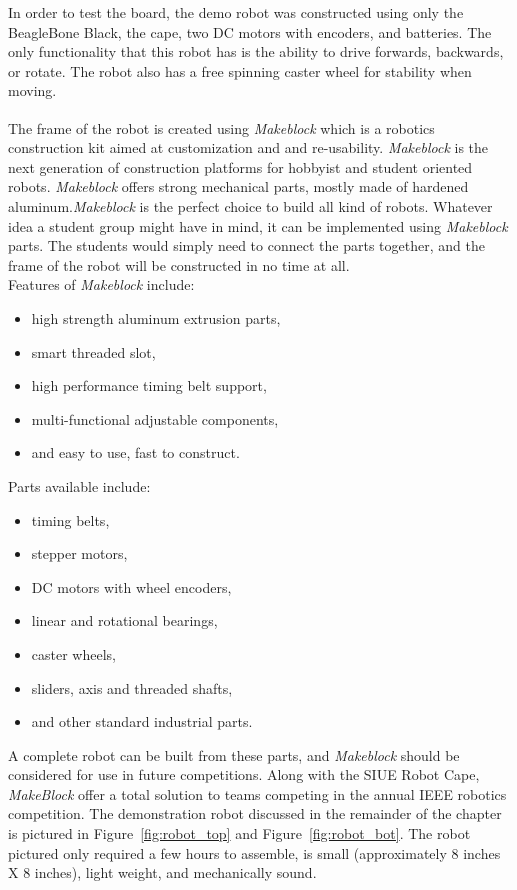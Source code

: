 \documentclass[12pt,oneside,final]{siuethesis}
\theoremstyle{definition}
\begin{document}
In order to test the board, the demo robot was constructed using only the BeagleBone Black, the cape, two DC motors with encoders, and batteries. The only functionality that this robot has is the ability to drive forwards, backwards, or rotate. The robot also has a free spinning caster wheel for stability when moving. 

The frame of the robot is created using \emph{Makeblock}\textsuperscript{\textregistered} which is a robotics construction kit aimed at customization and and re-usability. \emph{Makeblock} is the next generation of construction platforms for hobbyist and student oriented robots. \emph{Makeblock} offers strong mechanical parts, mostly made of hardened aluminum.\emph{Makeblock} is the perfect choice to build all kind of robots. Whatever idea a student group might have in mind, it can be implemented using \emph{Makeblock} parts.  The students would simply need to connect the parts together, and the frame of the robot will be constructed in no time at all. \\


\noindent
Features of \emph{Makeblock} include:

\begin{itemize}
\item
high strength aluminum extrusion parts,
\item
smart threaded slot,
\item
high performance timing belt support,
\item
multi-functional adjustable components,
\item
and easy to use, fast to construct.
\end{itemize}

\noindent
Parts available include:
\begin{itemize}
\item
timing belts,
\item
stepper motors,
\item
DC motors with wheel encoders,
\item
linear and rotational bearings,
\item
caster wheels,
\item
sliders, axis and threaded shafts,
\item
and other standard industrial parts.
\end{itemize}

A complete robot can be built from these parts, and \emph{Makeblock} should be considered for use in future competitions. Along with the SIUE Robot Cape, \emph{MakeBlock} offer a total solution to teams competing in the annual IEEE robotics competition. The demonstration robot discussed in the remainder of the chapter is pictured in Figure~\ref{fig:robot_top} and Figure~\ref{fig:robot_bot}. The robot pictured only required a few hours to assemble, is small (approximately 8 inches X 8 inches), light weight, and mechanically sound.  
\end{document}
